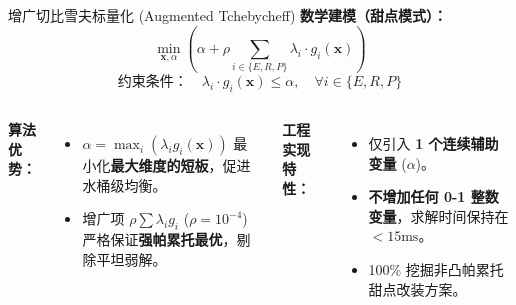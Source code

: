 \documentclass[aspectratio=169]{beamer}
\begin{document}
\begin{frame}{增广切比雪夫标量化 (Augmented Tchebycheff)}
    \textbf{数学建模（甜点模式）：}
    \[
    \min_{\mathbf{x}, \alpha} \left( \alpha + \rho \sum_{i \in \{E, R, P\}} \lambda_i \cdot g_i(\mathbf{x}) \right)
    \]
    \[
    \text{约束条件：} \quad \lambda_i \cdot g_i(\mathbf{x}) \le \alpha, \quad \forall i \in \{E, R, P\}
    \]

    \vspace{0.2cm}
    \begin{columns}
        \textbf{算法优势：}
        \begin{itemize}
            \item $\alpha = \max_i (\lambda_i g_i(\mathbf{x}))$ 最小化\textbf{最大维度的短板}，促进水桶级均衡。
            \item 增广项 $\rho \sum \lambda_i g_i$ ($\rho = 10^{-4}$) 严格保证\textbf{强帕累托最优}，剔除平坦弱解。
        \end{itemize}

        \textbf{工程实现特性：}
        \begin{itemize}
            \item 仅引入 \textbf{1 个连续辅助变量} ($\alpha$)。
            \item \textbf{不增加任何 0-1 整数变量}，求解时间保持在 $< 15\text{ms}$。
            \item 100\% 挖掘非凸帕累托甜点改装方案。
        \end{itemize}
    \end{columns}
\end{frame}
\end{document}
